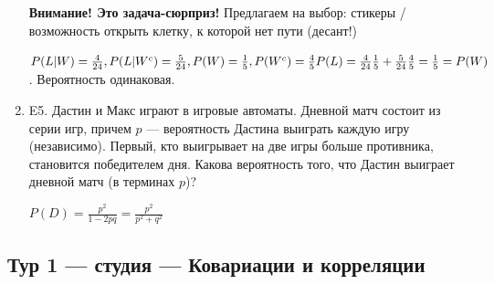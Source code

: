 \documentclass[12pt]{article}
\def \P{P}
\newenvironment{problem}{}{}
\newenvironment{sol}{}{} %
\begin{document}
\begin{enumerate}
\begin{problem}
\begin{sol}
\textbf{Внимание! Это задача-сюрприз!} Предлагаем на выбор: стикеры / возможность открыть клетку, к которой нет пути (десант!)

$\P(L|W)=\frac{4}{24}, \P(L|W^{c})=\frac{5}{24}, \P(W)=\frac{1}{5}, \P(W^{c})=\frac{4}{5} \\
\P(L)=\frac{4}{24}\frac{1}{5}+\frac{5}{24}\frac{4}{5} = \frac{1}{5}= \P(W)$. Вероятность одинаковая.
\end{sol}
\end{problem}

\begin{problem}
\item[E5.] Дастин и Макс играют в игровые автоматы. Дневной матч состоит из серии игр, причем $p$ — вероятность Дастина выиграть каждую игру (независимо). Первый, кто выигрывает на две игры больше противника, становится победителем дня. Какова вероятность того, что Дастин выиграет дневной матч (в терминах $p$)?

\begin{sol}
$\P(D) = \frac{p^2}{1-2pq}=\frac{p^2}{p^2+q^2}$
\end{sol}
\end{problem}

\end{enumerate}




\newpage
\subsection{Тур 1 — студия — Ковариации и корреляции}
\end{document}

